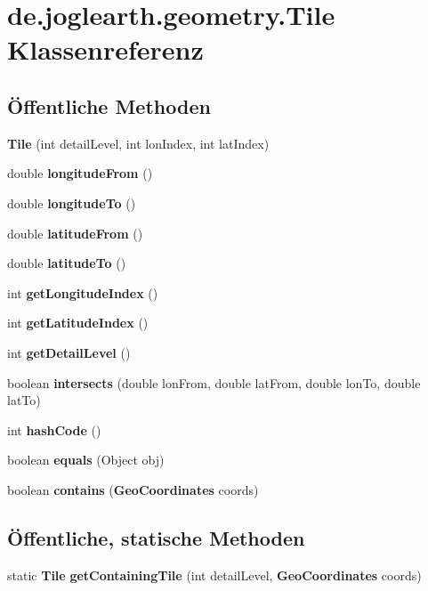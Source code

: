 \section{de.\-joglearth.\-geometry.\-Tile Klassenreferenz}
\label{classde_1_1joglearth_1_1geometry_1_1_tile}
\subsection*{Öffentliche Methoden}
\begin{DoxyCompactItemize}
\item 
{\bf Tile} (int detail\-Level, int lon\-Index, int lat\-Index)
\item 
double {\bf longitude\-From} ()
\item 
double {\bf longitude\-To} ()
\item 
double {\bf latitude\-From} ()
\item 
double {\bf latitude\-To} ()
\item 
int {\bf get\-Longitude\-Index} ()
\item 
int {\bf get\-Latitude\-Index} ()
\item 
int {\bf get\-Detail\-Level} ()
\item 
boolean {\bfseries intersects} (double lon\-From, double lat\-From, double lon\-To, double lat\-To)\label{classde_1_1joglearth_1_1geometry_1_1_tile_adfc74c03a286841a64ce0ee042c14434}

\item 
int {\bfseries hash\-Code} ()\label{classde_1_1joglearth_1_1geometry_1_1_tile_a3b21cc339782d60f6063a2400d404818}

\item 
boolean {\bfseries equals} (Object obj)\label{classde_1_1joglearth_1_1geometry_1_1_tile_a3fe21b8a7de2e649e281ad00e97bacaf}

\item 
boolean {\bfseries contains} ({\bf Geo\-Coordinates} coords)\label{classde_1_1joglearth_1_1geometry_1_1_tile_a4f74853fb1566ecc598bdde775b0b691}

\end{DoxyCompactItemize}
\subsection*{Öffentliche, statische Methoden}
\begin{DoxyCompactItemize}
\item 
static {\bf Tile} {\bf get\-Containing\-Tile} (int detail\-Level, {\bf Geo\-Coordinates} coords)
\end{DoxyCompactItemize}


